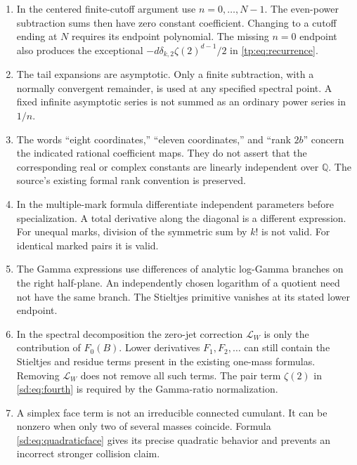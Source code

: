\begin{enumerate}
\item In the centered finite-cutoff argument use $n=0,\ldots,N-1$.
The even-power subtraction sums then have zero constant coefficient.
Changing to a cutoff ending at $N$ requires its endpoint polynomial.
The missing $n=0$ endpoint also produces the exceptional
$-d\delta_{k,2}\zeta(2)^{d-1}/2$ in
\eqref{tp:eq:recurrence}.

\item The tail expansions are asymptotic. Only a finite subtraction,
with a normally convergent remainder, is used at any specified
spectral point. A fixed infinite asymptotic series is not summed as
an ordinary power series in $1/n$.

\item The words ``eight coordinates,'' ``eleven coordinates,'' and
``rank $2b$'' concern the indicated rational coefficient maps. They do
not assert that the corresponding real or complex constants are
linearly independent over $\mathbb Q$. The source's existing formal
rank convention is preserved.

\item In the multiple-mark formula differentiate independent parameters
before specialization. A total derivative along the diagonal is a
different expression. For unequal marks, division of the symmetric
sum by $k!$ is not valid. For identical marked pairs it is valid.

\item The Gamma expressions use differences of analytic log-Gamma
branches on the right half-plane. An independently chosen logarithm
of a quotient need not have the same branch. The Stieltjes primitive
vanishes at its stated lower endpoint.

\item In the spectral decomposition the zero-jet correction
$\mathcal L_W$ is only the contribution of $F_0(B)$. Lower derivatives
$F_1,F_2,\ldots$ can still contain the Stieltjes and residue terms
present in the existing one-mass formulas. Removing $\mathcal L_W$
does not remove all such terms. The pair term $\zeta(2)$ in
\eqref{sd:eq:fourth} is required by the Gamma-ratio normalization.

\item A simplex face term is not an irreducible connected cumulant.
It can be nonzero when only two of several masses coincide. Formula
\eqref{sd:eq:quadraticface} gives its precise quadratic behavior and
prevents an incorrect stronger collision claim.
\end{enumerate}

